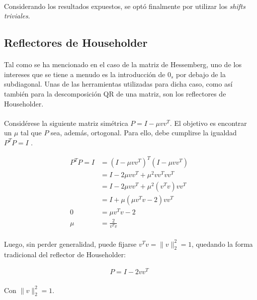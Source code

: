 \documentclass[12pt, twocolumn]{article}
\begin{document}
	\paragraph{} Considerando los resultados expuestos, se optó finalmente por utilizar los \textit{shifts} \textit{triviales}.
	
	\subsection{Reflectores de Householder}
	
	\paragraph{} Tal como se ha mencionado en el caso de la matriz de Hessemberg, uno de los intereses que se tiene a menudo es la introducción de $0_{s}$ por debajo de la subdiagonal. Unas de las herramientas utilizadas para dicha caso, como así también para la descomposición QR de una matriz, son los reflectores de Householder.
	
	\paragraph{} Considérese la siguiente matriz simétrica $P = I - \mu vv^{T}$. El objetivo es encontrar un $\mu$ tal que $P$ sea, además, ortogonal. Para ello, debe cumplirse la igualdad $P^{T}P = I$ \cite{l9}.
	
	
	\begin{align}
		P^{T}P = I &= (I - \mu vv^{T})^{T}(I - \mu vv^{T}) \\
		 &= I - 2\mu vv^{T} + \mu^{2}vv^{T}vv^{T} \\
		 &= I - 2\mu vv^{T} + \mu^{2}(v^{T}v)vv^{T} \\
		 &= I + \mu(\mu v^{T}v - 2)vv^{T} \\
		0 &= \mu v^{T}v - 2 \\
		\mu &= \frac{2}{v^{T}v}
	\end{align}
	
	\paragraph{} Luego, sin perder generalidad, puede fijarse $v^{T}v = \lVert v \rVert _{2}^{2} = 1$, quedando la forma tradicional del reflector de Householder:
	
	\begin{align}
		P = I - 2vv^{T}
	\end{align}
	\paragraph{}Con $\lVert v \rVert _{2}^{2} = 1$.
	
\end{document}

